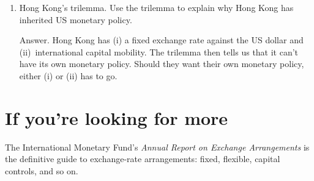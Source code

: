 \begin{enumerate}
\item Hong Kong's trilemma.
Use the trilemma to explain why Hong Kong has inherited US monetary policy.

Answer.  Hong Kong has (i) a fixed exchange rate against the US dollar and
(ii)~international capital mobility.
The trilemma then tells us that it can't have its own monetary policy.
Should they want their own monetary policy, either (i) or (ii) has to go.
\end{enumerate}
\setlength{\leftmargini}{\oldleftmargini}


\section*{If you're looking for more}

The International Monetary Fund's
{\it Annual Report on Exchange Arrangements\/}
is the definitive guide to exchange-rate arrangements:  fixed,
flexible, capital controls, and so on.


